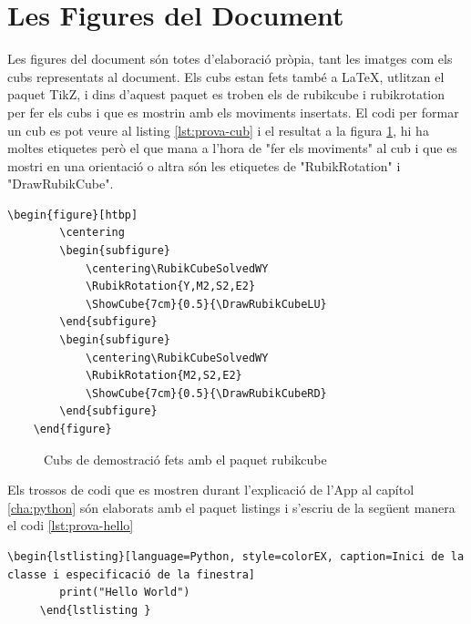\section{Les Figures del Document}

Les figures del document són totes d'elaboració pròpia, tant les imatges com els cubs representats al document. 
Els cubs estan fets també a LaTeX, utlitzan el paquet TikZ, i dins d'aquest paquet es troben els de rubikcube i rubikrotation per fer els cubs i que es mostrin amb els moviments insertats.
El codi per formar un cub es pot veure al listing \ref{lst:prova-cub} i el resultat a la figura \ref{fig:cubs-latex}, hi ha moltes etiquetes però el que mana a l'hora de "fer els moviments" al cub i que es mostri en una orientació o altra són les etiquetes de "RubikRotation" i "DrawRubikCube". 


\begin{lstlisting}[style=latex, caption={Exemple de Cubs fets amb el paquet rubikcube}, label={lst:prova-cub}]
    \begin{figure}[htbp]
        \centering
        \begin{subfigure}
            \centering\RubikCubeSolvedWY
            \RubikRotation{Y,M2,S2,E2}
            \ShowCube{7cm}{0.5}{\DrawRubikCubeLU}
        \end{subfigure}
        \begin{subfigure}
            \centering\RubikCubeSolvedWY
            \RubikRotation{M2,S2,E2}
            \ShowCube{7cm}{0.5}{\DrawRubikCubeRD}
        \end{subfigure}
    \end{figure}
\end{lstlisting}

\begin{figure}[htbp]
    \centering
    \begin{subfigure}
        \centering\RubikCubeSolvedWY
    \end{subfigure}
    \begin{subfigure}
        \centering\RubikCubeSolvedWY
    \end{subfigure}
    \caption{Cubs de demostració fets amb el paquet rubikcube}
    \label{fig:cubs-latex}
\end{figure}


Els trossos de codi que es mostren durant l'explicació de l'App al capítol \ref{cha:python} són elaborats amb el paquet listings i s'escriu de la següent manera el codi \ref{lst:prova-hello}

\begin{lstlisting}[style=latex, caption={Exemple de codi Hello world mostrat amb el paquet listings}, label={lst:prova-hello}]
    \begin{lstlisting}[language=Python, style=colorEX, caption=Inici de la classe i especificació de la finestra]
        print("Hello World")
     \end{lstlisting }
\end{lstlisting}

